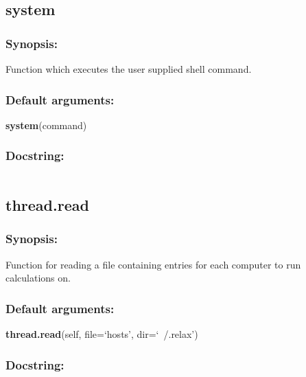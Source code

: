 \newpage

\subsection{system}


\subsubsection{Synopsis:}

Function which executes the user supplied shell command.

\subsubsection{Default arguments:}

\textsf{\textbf{system}(command)
}


\subsubsection{Docstring:}

{\scriptsize
\begin{verbatim}

\end{verbatim}
}



\newpage

\subsection{thread.read}


\subsubsection{Synopsis:}

Function for reading a file containing entries for each computer to run calculations on.

\subsubsection{Default arguments:}

\textsf{\textbf{thread.read}(self, file=`hosts', dir=`~/.relax')
}


\subsubsection{Docstring:}

